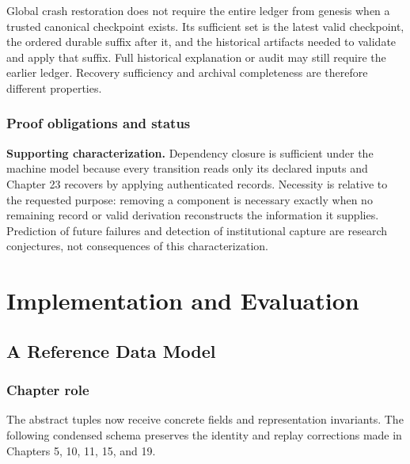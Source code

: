 \documentclass[11pt,openany]{book}
\begin{document}
Global crash restoration does not require the entire ledger from genesis when
a trusted canonical checkpoint exists. Its sufficient set is the latest valid
checkpoint, the ordered durable suffix after it, and the historical artifacts
needed to validate and apply that suffix. Full historical explanation or audit
may still require the earlier ledger. Recovery sufficiency and archival
completeness are therefore different properties.

\section{Proof obligations and status}
\textbf{Supporting characterization.} Dependency closure is sufficient under
the machine model because every transition reads only its declared inputs and
Chapter 23 recovers by applying authenticated records. Necessity is relative to
the requested purpose: removing a component is necessary exactly when no
remaining record or valid derivation reconstructs the information it supplies.
Prediction of future failures and detection of institutional capture are
research conjectures, not consequences of this characterization.

\part{Implementation and Evaluation}

\chapter{A Reference Data Model}
\section{Chapter role}
The abstract tuples now receive concrete fields and representation invariants.
The following condensed schema preserves the identity and replay corrections
made in Chapters 5, 10, 11, 15, and 19.
\end{document}
